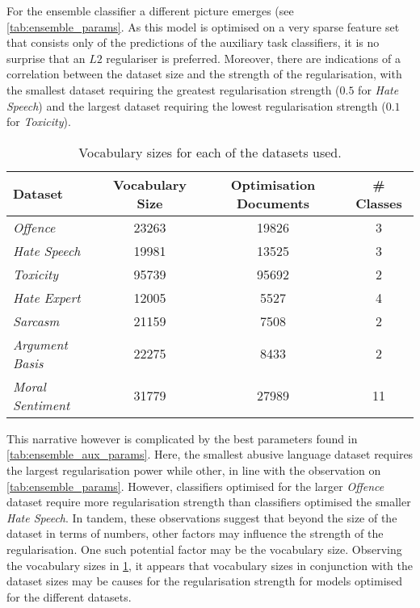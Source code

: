 For the ensemble classifier a different picture emerges (see \cref{tab:ensemble_params}.
As this model is optimised on a very sparse feature set that consists only of the predictions of the auxiliary task classifiers, it is no surprise that an $L2$ regulariser is preferred.
Moreover, there are indications of a correlation between the dataset size and the strength of the regularisation, with the smallest dataset requiring the greatest regularisation strength ($0.5$ for \textit{Hate Speech}) and the largest dataset requiring the lowest regularisation strength ($0.1$ for \textit{Toxicity}).

\begin{table}[]
  \centering
  \begin{tabular}{l|ccc}
    Dataset                  & Vocabulary Size & Optimisation Documents & \# Classes\\\hline
    \textit{Offence}         & 23263           & 19826              & 3\\
    \textit{Hate Speech}     & 19981           & 13525              & 3\\
    \textit{Toxicity}        & 95739           & 95692              & 2\\
    \textit{Hate Expert}     & 12005           & 5527               & 4\\
    \textit{Sarcasm}         & 21159           & 7508               & 2\\
    \textit{Argument Basis}  & 22275           & 8433               & 2\\
    \textit{Moral Sentiment} & 31779           & 27989              & 11
  \end{tabular}
  \caption{Vocabulary sizes for each of the datasets used.}
  \label{tab:aux_vocab_sizes}
\end{table}

This narrative however is complicated by the best parameters found in \cref{tab:ensemble_aux_params}.
Here, the smallest abusive language dataset requires the largest regularisation power while other, in line with the observation on \cref{tab:ensemble_params}.
However, classifiers optimised for the larger \textit{Offence} dataset require more regularisation strength than classifiers optimised the smaller \textit{Hate Speech}.
In tandem, these observations suggest that beyond the size of the dataset in terms of numbers, other factors may influence the strength of the regularisation.
One such potential factor may be the vocabulary size.
Observing the vocabulary sizes in \cref{tab:aux_vocab_sizes}, it appears that vocabulary sizes in conjunction with the dataset sizes may be causes for the regularisation strength for models optimised for the different datasets.

